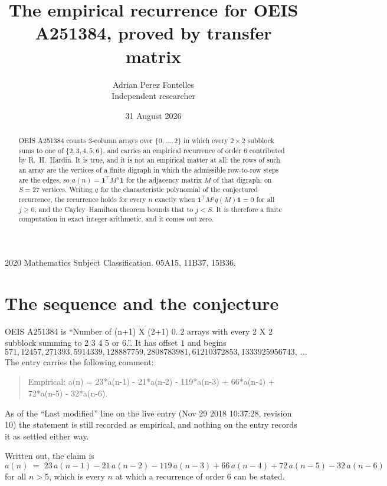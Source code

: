 \documentclass[11pt,a4paper]{article}
\title{The empirical recurrence for OEIS A251384, proved by transfer matrix}
\author{Adrian Perez Fontelles\\ \small Independent researcher}
\date{31 August 2026}
\theoremstyle{plain}
\theoremstyle{definition}
\begin{document}
\maketitle

\begin{abstract}
OEIS A251384 counts $3$-column arrays over $\{0,\dots,2\}$ in which every
$2\times2$ subblock sums to one of $\{2, 3, 4, 5, 6\}$, and carries an empirical
recurrence of order $6$ contributed by R.~H.~Hardin. It is true, and it is not an
empirical matter at all: the rows of such an array are the vertices of a finite digraph in
which the admissible row-to-row steps are the edges, so $a(n)=\mathbf{1}^{\!\top}M^{n}
\mathbf{1}$ for the adjacency matrix $M$ of that digraph, on $S=27$ vertices. Writing
$q$ for the characteristic polynomial of the conjectured recurrence, the recurrence holds
for every $n$ exactly when $\mathbf{1}^{\!\top}M^{j}q(M)\mathbf{1}=0$ for all
$j\ge0$, and the Cayley--Hamilton theorem bounds that to $j<S$. It is therefore a finite
computation in exact integer arithmetic, and it comes out zero.
\end{abstract}

\noindent\small 2020 Mathematics Subject Classification. 05A15, 11B37, 15B36.\normalsize

\section{The sequence and the conjecture}

OEIS A251384 is ``Number of (n+1) X (2+1) 0..2 arrays with every 2 X 2 subblock summing to 2 3 4 5 or 6.''. It has offset $1$
and begins
\[
571, 12457, 271393, 5914339, 128887759, 2808783981, 61210372853, 1333925956743,\ \dots
\]
The entry carries the following comment:
\begin{quote}\small
Empirical: a(n) = 23*a(n-1) - 21*a(n-2) - 119*a(n-3) + 66*a(n-4) + 72*a(n-5) - 32*a(n-6).
\end{quote}
As of the ``Last modified'' line on the live entry (Nov 29 2018 10:37:28, revision 10) the statement is
still recorded as empirical, and nothing on the entry records it as settled either way.

Written out, the claim is
\begin{equation}\label{eq:conj}
a(n)\;=\;23\,a(n-1) - 21\,a(n-2) - 119\,a(n-3) + 66\,a(n-4) + 72\,a(n-5) - 32\,a(n-6)
\end{equation}
for all $n>5$, which is every $n$ at which a recurrence of order $6$ can be
stated.
\end{document}
